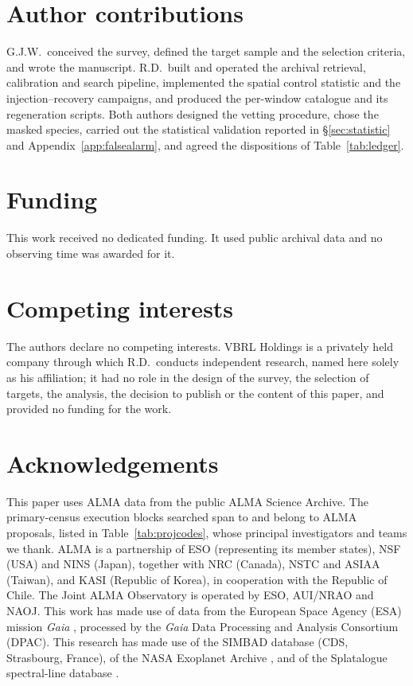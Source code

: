 \section*{Author contributions}
G.J.W.\ conceived the survey, defined the target sample and the selection
criteria, and wrote the manuscript. R.D.\ built and operated the archival
retrieval, calibration and search pipeline, implemented the spatial control
statistic and the injection--recovery campaigns, and produced the per-window
catalogue and its regeneration scripts. Both authors designed the vetting
procedure, chose the masked species, carried out the statistical
validation reported in \S\ref{sec:statistic} and
Appendix~\ref{app:falsealarm}, and agreed the dispositions of
Table~\ref{tab:ledger}.

\section*{Funding}
This work received no dedicated funding. It used public archival data and
no observing time was awarded for it.

\section*{Competing interests}
The authors declare no competing interests. VBRL Holdings is a privately
held company through which R.D.\ conducts independent research, named
here solely as his affiliation; it had no role in the design of the
survey, the selection of targets, the analysis, the decision to publish
or the content of this paper, and provided no funding for the work.

\section*{Acknowledgements}
This paper uses ALMA data from the public ALMA Science Archive. The \NEB{}
primary-census execution blocks searched span \PrEbDateFirst{} to
\PrEbDateLast{} and belong to \NProjCodes{} ALMA proposals, listed in
Table~\ref{tab:projcodes}, whose principal investigators and teams we
thank.\ProjCodeUnresClause{} ALMA is a partnership of ESO
(representing its member states), NSF (USA) and NINS (Japan), together with NRC
(Canada), NSTC and ASIAA (Taiwan), and KASI (Republic of Korea), in cooperation
with the Republic of Chile. The Joint ALMA Observatory is operated by ESO,
AUI/NRAO and NAOJ. This work has made use of data from the European Space
Agency (ESA) mission {\it Gaia} \citep{GaiaDR3}, processed by the {\it Gaia}
Data Processing and Analysis Consortium (DPAC). This research has made use
of the SIMBAD database \citep{SIMBAD2000} (CDS, Strasbourg, France), of the NASA Exoplanet
Archive \citep{NEA2013}, and of the Splatalogue spectral-line database
\citep{Splatalogue2007}.

